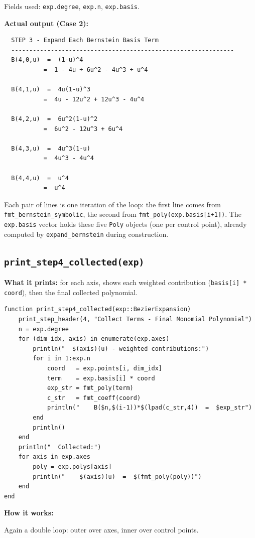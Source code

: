 \documentclass[12pt, a4paper]{article}
\newcommand{\cd}[1]{\texttt{#1}}
\begin{document}
Fields used: \cd{exp.degree}, \cd{exp.n}, \cd{exp.basis}.

\textbf{Actual output (Case 2):}
\begin{verbatim}
  STEP 3 - Expand Each Bernstein Basis Term
  --------------------------------------------------------------
  B(4,0,u)  =  (1-u)^4
           =  1 - 4u + 6u^2 - 4u^3 + u^4

  B(4,1,u)  =  4u(1-u)^3
           =  4u - 12u^2 + 12u^3 - 4u^4

  B(4,2,u)  =  6u^2(1-u)^2
           =  6u^2 - 12u^3 + 6u^4

  B(4,3,u)  =  4u^3(1-u)
           =  4u^3 - 4u^4

  B(4,4,u)  =  u^4
           =  u^4
\end{verbatim}

Each pair of lines is one iteration of the loop:
the first line comes from \cd{fmt\_bernstein\_symbolic},
the second from \cd{fmt\_poly(exp.basis[i+1])}.
The \cd{exp.basis} vector holds these five \cd{Poly} objects
(one per control point), already computed by \cd{expand\_bernstein}
during construction.

\subsection{\texttt{print\_step4\_collected(exp)}}

\textbf{What it prints:} for each axis, shows each weighted
contribution (\cd{basis[i] * coord}), then the final
collected polynomial.

\begin{verbatim}
function print_step4_collected(exp::BezierExpansion)
    print_step_header(4, "Collect Terms - Final Monomial Polynomial")
    n = exp.degree
    for (dim_idx, axis) in enumerate(exp.axes)
        println("  $(axis)(u) - weighted contributions:")
        for i in 1:exp.n
            coord   = exp.points[i, dim_idx]
            term    = exp.basis[i] * coord
            exp_str = fmt_poly(term)
            c_str   = fmt_coeff(coord)
            println("    B($n,$(i-1))*$(lpad(c_str,4))  =  $exp_str")
        end
        println()
    end
    println("  Collected:")
    for axis in exp.axes
        poly = exp.polys[axis]
        println("    $(axis)(u)  =  $(fmt_poly(poly))")
    end
end
\end{verbatim}

\textbf{How it works:}

Again a double loop: outer over axes, inner over control points.
\end{document}
